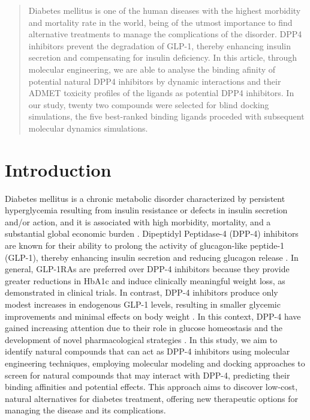 \documentclass[portrait,final,20pt,ra0]{sciposter}
\begin{document}
\begin{multicols*}{3}
  \begin{abstract}
Diabetes mellitus is one of the human diseases with the highest morbidity and mortality rate in the world, being of the utmost importance to find alternative treatments to manage the complications of the disorder. DPP4 inhibitors prevent the degradation of GLP-1, thereby enhancing insulin secretion and compensating for insulin deficiency. In this article, through molecular engineering, we are able to analyse the binding afinity of potential natural DPP4 inhibitors by dynamic interactions and their ADMET toxicity profiles of the ligands as potential DPP4 inhibitors. In our study, twenty two compounds were selected for blind docking simulations, the five best-ranked binding ligands proceded with subsequent molecular dynamics simulations.  
  \end{abstract}
  \section*{Introduction}
Diabetes mellitus is a chronic metabolic disorder characterized by persistent hyperglycemia resulting from insulin resistance or defects in insulin secretion and/or action, and it is associated with high morbidity, mortality, and a substantial global economic burden \cite{Zarei_2024,2025}. Dipeptidyl Peptidase-4 (DPP-4) inhibitors are known for their ability to \cite{Shao2024, Hossain2024, Kuthati2025} prolong the activity of glucagon-like peptide-1 (GLP-1), thereby enhancing insulin secretion and reducing glucagon release \cite{Shao2024,Hossain2024, Kuthati2025}. In general, GLP-1RAs are preferred over DPP-4 inhibitors because they provide greater reductions in HbA1c and induce clinically meaningful weight loss, as demonstrated in clinical trials. In contrast, DPP-4 inhibitors produce only modest increases in endogenous GLP-1 levels, resulting in smaller glycemic improvements and minimal effects on body weight \cite{Gilbert2020}. In this context, DPP-4 \cite{Abbas2024} have gained increasing attention due to their role in glucose homeostasis and the development of novel pharmacological strategies \cite{Zarei_2024, Pezzoli2025}. In this study, we aim to identify natural compounds that can act as DPP-4 inhibitors using molecular engineering techniques, employing molecular modeling and docking approaches to screen for natural compounds that may interact with DPP-4, predicting their binding affinities and potential effects. This approach aims to discover low-cost, natural alternatives for diabetes treatment, offering new therapeutic options for managing the disease and its complications. 


\end{multicols*}
\end{document}
